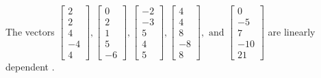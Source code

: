 \begin{exercise}
\begin{exerciseStatement}
  \end{exerciseStatement}
  \begin{exerciseAnswer}
   The vectors \(\left[\begin{array}{r}
2 \\
2 \\
4 \\
-4 \\
4
\end{array}\right] , \left[\begin{array}{r}
0 \\
2 \\
1 \\
5 \\
-6
\end{array}\right] , \left[\begin{array}{r}
-2 \\
-3 \\
5 \\
4 \\
5
\end{array}\right] , \left[\begin{array}{r}
4 \\
4 \\
8 \\
-8 \\
8
\end{array}\right] , \text{ and } \left[\begin{array}{r}
0 \\
-5 \\
7 \\
-10 \\
21
\end{array}\right]\) are 
  	 linearly dependent  .
  


  \end{exerciseAnswer}
\end{exercise}